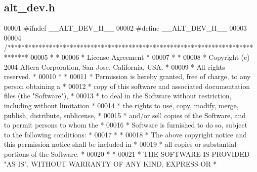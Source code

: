 \subsection{alt\+\_\+dev.\+h}
\label{alt__dev_8h_source}

\begin{DoxyCode}
00001 \textcolor{preprocessor}{#ifndef \_\_ALT\_DEV\_H\_\_}
00002 \textcolor{preprocessor}{#define \_\_ALT\_DEV\_H\_\_}
00003 
00004 \textcolor{comment}{/******************************************************************************}
00005 \textcolor{comment}{*                                                                             *}
00006 \textcolor{comment}{* License Agreement                                                           *}
00007 \textcolor{comment}{*                                                                             *}
00008 \textcolor{comment}{* Copyright (c) 2004 Altera Corporation, San Jose, California, USA.           *}
00009 \textcolor{comment}{* All rights reserved.                                                        *}
00010 \textcolor{comment}{*                                                                             *}
00011 \textcolor{comment}{* Permission is hereby granted, free of charge, to any person obtaining a     *}
00012 \textcolor{comment}{* copy of this software and associated documentation files (the "Software"),  *}
00013 \textcolor{comment}{* to deal in the Software without restriction, including without limitation   *}
00014 \textcolor{comment}{* the rights to use, copy, modify, merge, publish, distribute, sublicense,    *}
00015 \textcolor{comment}{* and/or sell copies of the Software, and to permit persons to whom the       *}
00016 \textcolor{comment}{* Software is furnished to do so, subject to the following conditions:        *}
00017 \textcolor{comment}{*                                                                             *}
00018 \textcolor{comment}{* The above copyright notice and this permission notice shall be included in  *}
00019 \textcolor{comment}{* all copies or substantial portions of the Software.                         *}
00020 \textcolor{comment}{*                                                                             *}
00021 \textcolor{comment}{* THE SOFTWARE IS PROVIDED "AS IS", WITHOUT WARRANTY OF ANY KIND, EXPRESS OR  *}

\end{DoxyCode}
